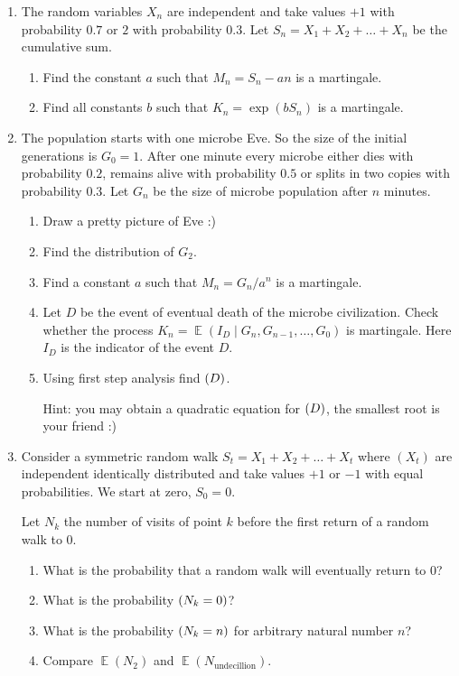 \documentclass[12pt]{article}
\let\P\relax
\DeclareMathOperator{\P}{\mathbb{P}}
\DeclareMathOperator{\E}{\mathbb{E}}
\begin{document}
\begin{enumerate}
\item The random variables $X_n$ are independent and take values $+1$ with probability $0.7$ or $2$ with probability $0.3$.
Let $S_n = X_1 + X_2 + \dots + X_n$ be the cumulative sum. 

\begin{enumerate}
    \item Find the constant $a$ such that $M_n = S_n - a n$ is a martingale.
    \item Find all constants $b$ such that $K_n = \exp(b S_n)$ is a martingale.
\end{enumerate}

\item The population starts with one microbe Eve.
So the size of the initial generations is $G_0 = 1$. 
After one minute every microbe either dies with probability $0.2$, remains alive with probability $0.5$ or splits in two copies with probability $0.3$.
Let $G_n$ be the size of microbe population after $n$ minutes.

\begin{enumerate}
    \item Draw a pretty picture of Eve :)
    \item Find the distribution of $G_2$. 
    \item Find a constant $a$ such that $M_n = G_n /a^n$ is a martingale. 
    \item Let $D$ be the event of eventual death of the microbe civilization. 
    Check whether the process $K_n = \E(I_D \mid G_n, G_{n-1}, \dots, G_0)$ is martingale. 
    Here $I_D$ is the indicator of the event $D$.
    \item Using first step analysis find $\P(D)$.
    
    Hint: you may obtain a quadratic equation for $\P(D)$, the smallest root is your friend :)
\end{enumerate}

\item Consider a symmetric random walk $S_t = X_1 + X_2 +\dots + X_t$ where $(X_t)$ are
independent identically distributed and take values $+1$ or $-1$ with equal probabilities.
We start at zero, $S_0 = 0$.

Let $N_k$ the number of visits of point $k$ before the first return of a random walk to $0$.

\begin{enumerate}
    \item What is the probability that a random walk will eventually return to $0$?
    \item What is the probability $\P(N_k = 0)$?
    \item What is the probability $\P(N_k = n)$ for arbitrary natural number $n$?
    \item Compare $\E(N_2)$ and $\E(N_{\text{undecillion}})$.
\end{enumerate}



\end{enumerate}
\end{document}
